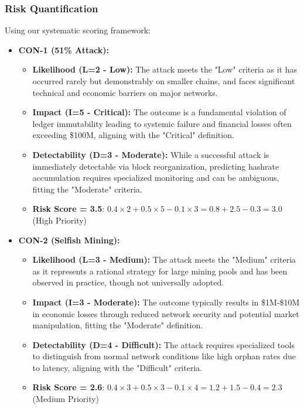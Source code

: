 \subsubsection{Risk Quantification}

Using our systematic scoring framework:

\begin{itemize}
    \item \textbf{CON-1 (51\% Attack):}
    \begin{itemize}
        \item \textbf{Likelihood (L=2 - Low):} The attack meets the "Low" criteria as it has occurred rarely but demonstrably on smaller chains, and faces significant technical and economic barriers on major networks.
        \item \textbf{Impact (I=5 - Critical):} The outcome is a fundamental violation of ledger immutability leading to systemic failure and financial losses often exceeding \$100M, aligning with the "Critical" definition.
        \item \textbf{Detectability (D=3 - Moderate):} While a successful attack is immediately detectable via block reorganization, predicting hashrate accumulation requires specialized monitoring and can be ambiguous, fitting the "Moderate" criteria.
        \item \textbf{Risk Score = 3.5}: $0.4 \times 2 + 0.5 \times 5 - 0.1 \times 3 = 0.8 + 2.5 - 0.3 = 3.0$ (High Priority)
    \end{itemize}
    
    \item \textbf{CON-2 (Selfish Mining):}
    \begin{itemize}
        \item \textbf{Likelihood (L=3 - Medium):} The attack meets the "Medium" criteria as it represents a rational strategy for large mining pools and has been observed in practice, though not universally adopted.
        \item \textbf{Impact (I=3 - Moderate):} The outcome typically results in \$1M-\$10M in economic losses through reduced network security and potential market manipulation, fitting the "Moderate" definition.
        \item \textbf{Detectability (D=4 - Difficult):} The attack requires specialized tools to distinguish from normal network conditions like high orphan rates due to latency, aligning with the "Difficult" criteria.
        \item \textbf{Risk Score = 2.6}: $0.4 \times 3 + 0.5 \times 3 - 0.1 \times 4 = 1.2 + 1.5 - 0.4 = 2.3$ (Medium Priority)
    \end{itemize}


\end{itemize}
